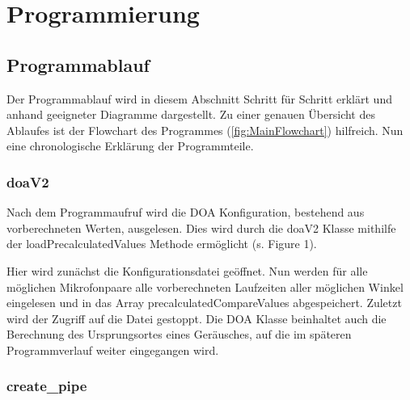 \section{Programmierung}

\subsection{Programmablauf}

Der Programmablauf wird in diesem Abschnitt Schritt für Schritt erklärt und anhand geeigneter Diagramme dargestellt. Zu einer genauen Übersicht des Ablaufes ist der Flowchart des Programmes (\autoref{fig:MainFlowchart}) hilfreich. Nun eine chronologische Erklärung der Programmteile.



\subsubsection{doaV2}

Nach dem Programmaufruf wird die DOA Konfiguration, bestehend aus vorberechneten Werten, ausgelesen. Dies wird durch die doaV2 Klasse mithilfe der loadPrecalculatedValues Methode ermöglicht (s. Figure 1).

Hier wird zunächst die Konfigurationsdatei geöffnet. Nun werden für alle möglichen Mikrofonpaare alle vorberechneten Laufzeiten aller möglichen Winkel eingelesen und in das Array precalculatedCompareValues abgespeichert. Zuletzt wird der Zugriff auf die Datei gestoppt. Die DOA Klasse beinhaltet auch die Berechnung des Ursprungsortes eines Geräusches, auf die im späteren Programmverlauf weiter eingegangen wird.



\subsubsection{create\_pipe}

